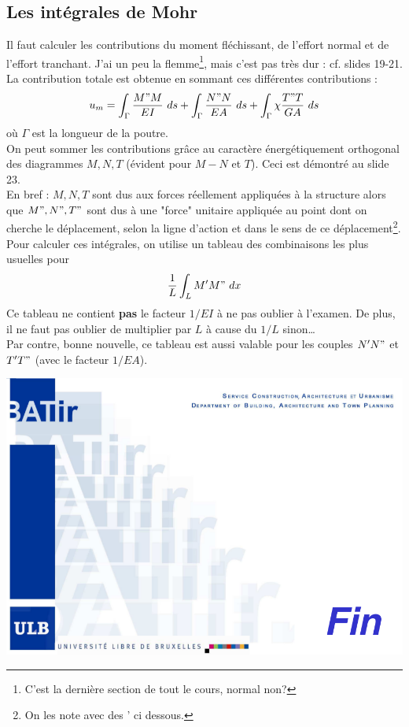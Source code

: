 	\newpage
	\subsection{Les intégrales de Mohr}
	Il faut calculer les contributions du moment fléchissant, de l'effort 
	normal et de l'effort tranchant. J'ai un peu la flemme\footnote{C'est la 
	dernière section de tout le cours, normal non?}, mais c'est pas 
	très dur : cf. slides 19-21.\\
	La contribution totale est obtenue en sommant ces différentes 
	contributions :
	\begin{equation}
	u_m = \int_{\Gamma} \dfrac{M"M}{EI}\ ds + \int_\Gamma \dfrac{N"N}{EA}\ ds + 
	\int_\Gamma	\chi\dfrac{T"T}{GA}\ ds
	\end{equation}
	où $\Gamma$ est la longueur de la poutre.\\
	\danger On peut sommer les contributions grâce au caractère 
	énergétiquement orthogonal des diagrammes $M, N, T$ (évident pour $M-N$ 
	et $T$). Ceci est démontré au slide 23.\\
	
	En bref : $M,N,T$ sont dus aux forces réellement appliquées à la structure 
	alors que $M", N", T"$ sont dus à une "force" unitaire appliquée au point 
	dont on cherche le déplacement, selon la ligne d'action et dans le sens de 
	ce déplacement\footnote{\danger On les note avec des ' ci dessous.}.\\
	
	Pour calculer ces intégrales, on utilise un tableau des combinaisons les 
	plus usuelles pour 
	\begin{equation}
	\dfrac{1}{L}\int_L M'M"\ dx
	\end{equation}
	\danger Ce tableau ne contient \textbf{pas} le facteur $1/EI$ à ne pas 
	oublier à l'examen. De plus, il ne faut pas oublier de multiplier par 
	$L$ à cause du $1/L$ sinon\dots\\
	
	Par contre, bonne nouvelle, ce tableau est aussi valable pour les couples 
	$N'N"$ et $T'T"$ (\danger avec le facteur $1/EA$).
	\begin{center}
	\includegraphics[scale=0.4]{ch8/image3}
	\end{center}
		

